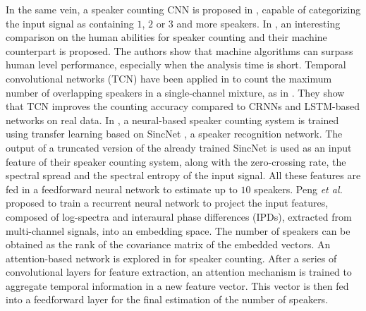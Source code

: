In the same vein, a speaker counting CNN is proposed in \cite{wei_determining_2018}, capable of categorizing the input signal as containing $1$, $2$ or $3$ and more speakers. In \cite{andrei_overlapped_2019}, an interesting comparison on the human abilities for speaker counting and their machine counterpart is proposed. The authors show that machine algorithms can surpass human level performance, especially when the analysis time is short. Temporal convolutional networks (TCN) have been applied in \cite{cornell_detecting_2020} to count the maximum number of overlapping speakers in a single-channel mixture, as in \cite{stoter_classification_2018}. They show that TCN improves the counting accuracy compared to CRNNs and LSTM-based networks on real data. In \cite{wang_speaker_2020}, a neural-based speaker counting system is trained using transfer learning based on SincNet \cite{ravanelli_speaker_2018}, a speaker recognition network. The output of a truncated version of the already trained SincNet is used as an input feature of their speaker counting system, along with the zero-crossing rate, the spectral spread and the spectral entropy of the input signal. All these features are fed in a feedforward neural network to estimate up to $10$ speakers. Peng \textit{et al.}~\cite{peng_competing_2020} proposed to train a recurrent neural network to project the input features, composed of log-spectra and interaural phase differences (IPDs), extracted from multi-channel signals, into an embedding space. The number of speakers can be obtained as the rank of the covariance matrix of the embedded vectors. An attention-based network is explored in \cite{yousefi_real-time_2021} for speaker counting. After a series of convolutional layers for feature extraction, an attention mechanism is trained to aggregate temporal information in a new feature vector. This vector is then fed into a feedforward layer for the final estimation of the number of speakers.

